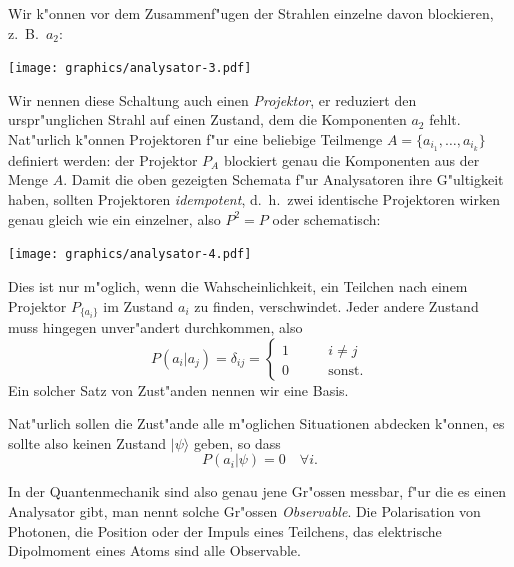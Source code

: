 Wir k"onnen vor dem Zusammenf"ugen der Strahlen einzelne davon
blockieren, z.~B.~$a_2$:
\begin{center}
\texttt{[image: graphics/analysator-3.pdf]}
\end{center}
%
Wir nennen diese Schaltung auch einen {\em Projektor}, er reduziert den
urspr"unglichen Strahl auf einen Zustand, dem die Komponenten $a_2$
fehlt. Nat"urlich k"onnen Projektoren f"ur eine beliebige Teilmenge
$A=\{a_{i_1},\dots, a_{i_k}\}$ definiert werden: der Projektor $P_A$
blockiert genau die Komponenten aus der Menge $A$.
%
Damit die oben gezeigten Schemata f"ur Analysatoren ihre G"ultigkeit
haben, sollten Projektoren {\em idempotent}, d.~h.~zwei identische 
Projektoren wirken genau gleich wie ein einzelner, also $P^2=P$ oder
schematisch:
\begin{center}
\texttt{[image: graphics/analysator-4.pdf]}
\end{center}

Dies ist nur m"oglich, wenn die Wahscheinlichkeit, ein Teilchen nach
einem Projektor $P_{\{a_i\}}$ im Zustand $a_i$ zu finden, verschwindet.
Jeder andere Zustand muss hingegen unver"andert durchkommen, also
\[
P(a_i|a_j)=\delta_{ij}=\begin{cases}
1&\qquad i\ne j\\
0&\qquad\text{sonst.}
\end{cases}
\]
Ein solcher Satz von Zust"anden nennen wir eine Basis.

Nat"urlich sollen die Zust"ande alle m"oglichen Situationen abdecken
k"onnen, es sollte also keinen Zustand $|\psi\rangle$ geben, so dass
\[
P(a_i|\psi)=0\quad\forall i.
\]

%
In der Quantenmechanik sind also genau jene Gr"ossen messbar, f"ur die
es einen Analysator gibt, man nennt solche Gr"ossen {\em Observable}.
Die Polarisation von Photonen, die Position oder der Impuls
eines Teilchens, das elektrische Dipolmoment eines Atoms sind alle
Observable.

